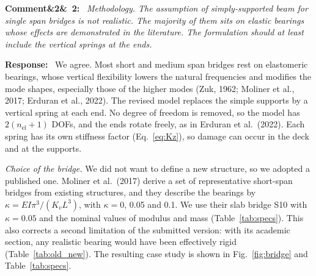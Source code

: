 \documentclass[11pt]{article}
\newenvironment{rcomment}[1]{\par\bigskip\noindent\textbf{Comment\ifx&#1&\else\ #1\fi:}\ \itshape}{\par}
\newenvironment{response}{\par\smallskip\noindent\color{resp}\textbf{Response:}\ }{\par}
\begin{document}
\begin{rcomment}{2}
Methodology. The assumption of simply-supported beam for single span bridges is not realistic. The majority of them
sits on elastic bearings whose effects are demonstrated in the literature. The formulation should at least include the
vertical springs at the ends.
\end{rcomment}

\begin{response}
We agree. Most short and medium span bridges rest on elastomeric bearings, whose vertical flexibility lowers the natural
frequencies and modifies the mode shapes, especially those of the higher modes (Zuk, 1962; Moliner et al., 2017; Erduran et al.,
2022). The revised model replaces the simple supports by a vertical spring at each end. No degree of freedom is removed, so the
model has $2(n_{\mathrm{el}}+1)$ DOFs, and the ends rotate freely, as in Erduran et al.\ (2022). Each spring has its own stiffness
factor (Eq.~\eqref{eq:Kz}), so damage can occur in the deck and at the supports.

\textit{Choice of the bridge.} We did not want to define a new structure, so we adopted a published one. Moliner et al.\ (2017)
derive a set of representative short-span bridges from existing structures, and they describe the bearings by
$\kappa=EI\pi^3/(K_vL^3)$, with $\kappa=0$, 0.05 and 0.1. We use their slab bridge S10 with $\kappa=0.05$ and the nominal values of
modulus and mass (Table~\ref{tab:specs}). This also corrects a second limitation of the submitted version: with its academic
section, any realistic bearing would have been effectively rigid (Table~\ref{tab:old_new}). The resulting case study is shown in Fig.~\ref{fig:bridge} and Table~\ref{tab:specs}.


\end{response}
\end{document}
